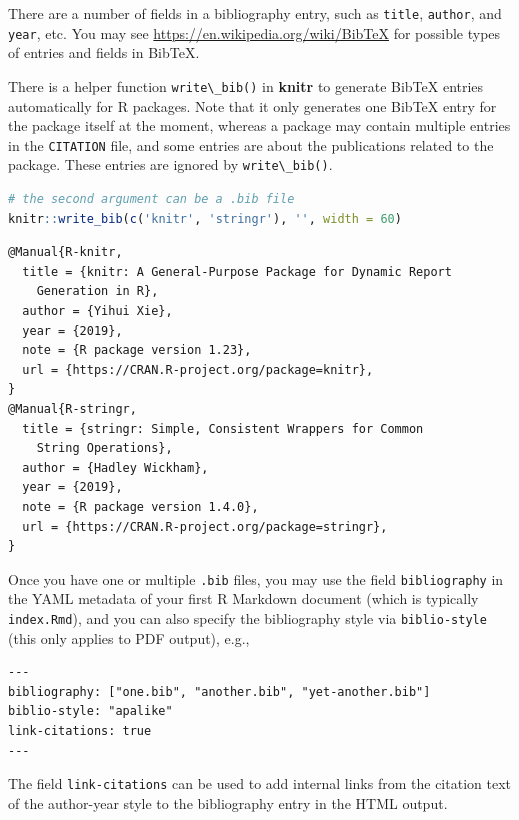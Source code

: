 \documentclass[doctor,openright,twoside]{sjtuthesis}
\newcommand{\passthrough}[1]{#1}
\theoremstyle{plain}
\theoremstyle{definition}
\theoremstyle{remark}
\theoremstyle{ocrenumbox}
\theoremstyle{plain}
\begin{document}
There are a number of fields in a bibliography entry, such as \passthrough{\lstinline!title!}, \passthrough{\lstinline!author!}, and \passthrough{\lstinline!year!}, etc. You may see \url{https://en.wikipedia.org/wiki/BibTeX} for possible types of entries and fields in BibTeX.

There is a helper function \passthrough{\lstinline!write\_bib()!} in \textbf{knitr} to generate BibTeX entries automatically for R packages. Note that it only generates one BibTeX entry for the package itself at the moment, whereas a package may contain multiple entries in the \passthrough{\lstinline!CITATION!} file, and some entries are about the publications related to the package. These entries are ignored by \passthrough{\lstinline!write\_bib()!}.

\begin{lstlisting}[language=R]
# the second argument can be a .bib file
knitr::write_bib(c('knitr', 'stringr'), '', width = 60)
\end{lstlisting}

\begin{lstlisting}
@Manual{R-knitr,
  title = {knitr: A General-Purpose Package for Dynamic Report
    Generation in R},
  author = {Yihui Xie},
  year = {2019},
  note = {R package version 1.23},
  url = {https://CRAN.R-project.org/package=knitr},
}
@Manual{R-stringr,
  title = {stringr: Simple, Consistent Wrappers for Common
    String Operations},
  author = {Hadley Wickham},
  year = {2019},
  note = {R package version 1.4.0},
  url = {https://CRAN.R-project.org/package=stringr},
}
\end{lstlisting}

Once you have one or multiple \passthrough{\lstinline!.bib!} files, you may use the field \passthrough{\lstinline!bibliography!} in the YAML metadata of your first R Markdown document (which is typically \passthrough{\lstinline!index.Rmd!}), and you can also specify the bibliography style via \passthrough{\lstinline!biblio-style!} (this only applies to PDF output), e.g.,

\begin{lstlisting}
---
bibliography: ["one.bib", "another.bib", "yet-another.bib"]
biblio-style: "apalike"
link-citations: true
---
\end{lstlisting}

The field \passthrough{\lstinline!link-citations!} can be used to add internal links from the citation text of the author-year style to the bibliography entry in the HTML output.
\end{document}
